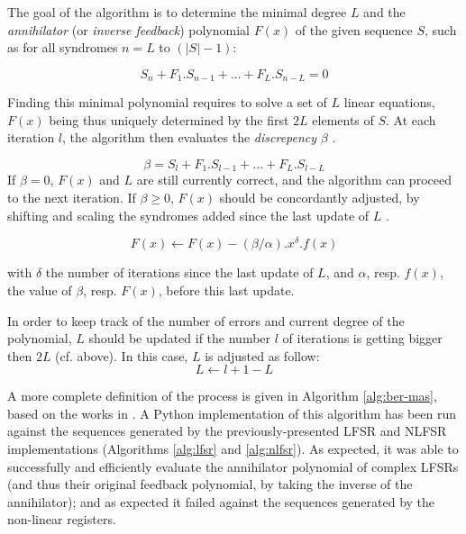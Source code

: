 \documentclass{llncs}
\begin{document}
The goal of the algorithm is to determine the minimal degree $L$ and the \emph{annihilator} (or \emph{inverse feedback}) polynomial $F(x)$ of the given sequence $S$, such as for all syndromes $n = L$ to $(|S|-1)$:

$$S_n + F_1 . S_{n-1} + ... + F_L . S_{n-L} = 0$$

Finding this minimal polynomial requires to solve a set of $L$ linear equations, $F(x)$ being thus uniquely determined by the first $2L$ elements of $S$. At each iteration $l$, the algorithm then evaluates the \emph{discrepency} $\beta$ \cite{joux,feng:tzeng}.

$$ \beta = S_l + F_1 . S_{l-1} + ... + F_L . S_{l-L}$$
If $\beta = 0$, $F(x)$ and $L$ are still currently correct, and the algorithm can proceed to the next iteration. If $\beta \geq 0$, $F(x)$ should be concordantly adjusted, by shifting and scaling the syndromes added since the last update of $L$ \cite{joux}.

$$F(x) \gets F(x) - (\beta/\alpha).x^\delta.f(x)$$


with $\delta$ the number of iterations since the last update of $L$, and $\alpha$, resp. $f(x)$, the value of $\beta$, resp. $F(x)$, before this last update.

In order to keep track of the number of errors and current degree of the polynomial, $L$ should be updated if the number $l$ of iterations is getting bigger then $2L$ (cf. above). In this case, $L$ is adjusted as follow:
$$L \gets l + 1 - L$$

A more complete definition of the process is given in Algorithm \ref{alg:ber-mas}, based on the works in \cite{joux,rodri}. A Python implementation of this algorithm has been run against the sequences generated by the previously-presented LFSR and NLFSR implementations (Algorithms \ref{alg:lfsr} and \ref{alg:nlfsr}). As expected, it was able to successfully and efficiently evaluate the annihilator polynomial of complex LFSRs (and thus their original feedback polynomial, by taking the inverse of the annihilator); and as expected it failed against the sequences generated by the non-linear registers.
\end{document}
